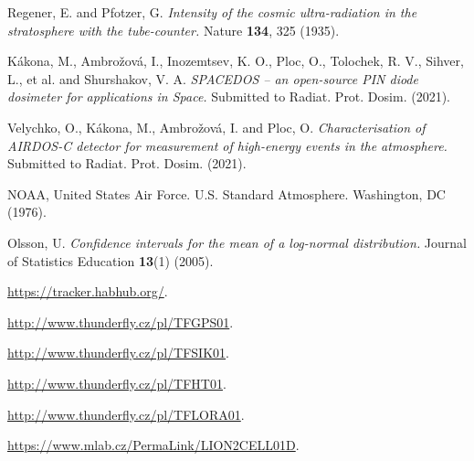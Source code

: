 \documentclass{Rpd}
\begin{document}
\begin{thebibliography}{99.}
 Regener, E. and Pfotzer, G. {\it Intensity of the cosmic ultra-radiation in the stratosphere with the tube-counter.} Nature {\bf 134}, 325 (1935).

 Kákona, M., Ambrožová, I., Inozemtsev, K. O., Ploc, O., Tolochek, R. V., Sihver, L., et al. and Shurshakov, V. A. {\it SPACEDOS – an open-source PIN diode dosimeter for applications in Space.} Submitted to Radiat. Prot. Dosim. (2021).

 Velychko, O., Kákona, M., Ambrožová, I. and Ploc, O. {\it Characterisation of AIRDOS-C detector for measurement of high-energy events in the atmosphere.} Submitted to Radiat. Prot. Dosim. (2021).

 NOAA, United States Air Force. U.S. Standard Atmosphere. Washington, DC (1976).

 Olsson, U. {\it Confidence intervals for the mean of a log-normal distribution.} Journal of Statistics Education {\bf 13}(1) (2005).

 \url{https://tracker.habhub.org/}.

  \url{http://www.thunderfly.cz/pl/TFGPS01}.

   \url{http://www.thunderfly.cz/pl/TFSIK01}.

  \url{http://www.thunderfly.cz/pl/TFHT01}.

  \url{http://www.thunderfly.cz/pl/TFLORA01}.

  \url{https://www.mlab.cz/PermaLink/LION2CELL01D}.



\end{thebibliography}
\end{document}
